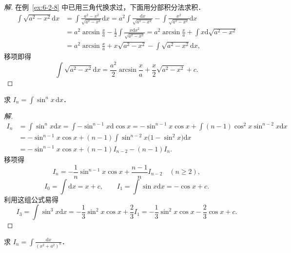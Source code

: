 \begin{proof}[解]
在例~\ref{ex:6-2-8} 中已用三角代换求过，下面用分部积分法求积．
\[
\begin{aligned}
\int\sqrt{a^{2}-x^{2}}\mathrm{d}x
&= \int\frac{a^{2}-x^{2}}{\sqrt{a^{2}-x^{2}}}\mathrm{d}x
= a^{2}\int\frac{\mathrm{d}x}{\sqrt{a^{2}-x^{2}}}-\int\frac{x^{2}}{\sqrt{a^{2}-x^{2}}}\mathrm{d}x\\
&= a^{2}\arcsin\frac{x}{a}-\frac{1}{2}\int\frac{x\mathrm{d}x^{2}}{\sqrt{a^{2}-x^{2}}}
= a^{2}\arcsin\frac{x}{a}+\int x\mathrm{d}\sqrt{a^{2}-x^{2}}\\
&= a^{2}\arcsin\frac{x}{a}+x\sqrt{a^{2}-x^{2}}-\int\sqrt{a^{2}-x^{2}}\mathrm{d}x,
\end{aligned}
\]
移项即得
\[
\int\sqrt{a^{2}-x^{2}}\mathrm{d}x
= \frac{a^{2}}{2}\arcsin\frac{x}{a}+\frac{x}{2}\sqrt{a^{2}-x^{2}}+c.
\]
\end{proof}

\begin{example}\label{ex:6-2-19}
求 $\displaystyle I_{n} = \int\sin^{n}x\,\mathrm{d}x$．
\end{example}

\begin{proof}[解]
\[
\begin{aligned}
I_{n} &= \int\sin^{n}x\mathrm{d}x
= \int-\sin^{n-1}x\mathrm{d}\cos x
= -\sin^{n-1}x\cos x+\int(n-1)\cos^{2}x\sin^{n-2}x\mathrm{d}x\\
&= -\sin^{n-1}x\cos x+(n-1)\int\sin^{n-2}x\big(1-\sin^{2}x\big)\mathrm{d}x\\
&= -\sin^{n-1}x\cos x+(n-1)I_{n-2}-(n-1)I_{n}.
\end{aligned}
\]
移项得
\[
I_{n} = -\frac{1}{n}\sin^{n-1}x\cos x+\frac{n-1}{n}I_{n-2}\quad(n \geqslant 2),
\]
\[
I_{0} = \int\mathrm{d}x = x+c,\qquad I_{1} = \int\sin x\mathrm{d}x = -\cos x+c.
\]
利用这组公式易得
\[
I_{3} = \int\sin^{3}x\mathrm{d}x
= -\frac{1}{3}\sin^{2}x\cos x+\frac{2}{3}I_{1}
= -\frac{1}{3}\sin^{2}x\cos x-\frac{2}{3}\cos x+c.
\]
\end{proof}

\begin{example}\label{ex:6-2-20}
求 $\displaystyle I_{n} = \int\frac{\mathrm{d}x}{\left(x^{2}+a^{2}\right)^{n}}$．
\end{example}


